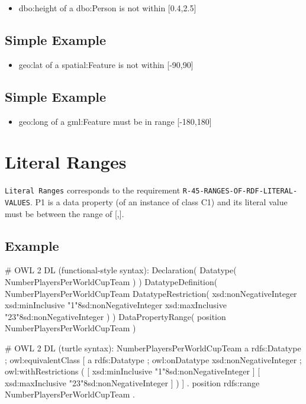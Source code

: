 \documentclass{llncs}
\newcommand{\ms}[1]{\texttt{#1}}
\begin{document}
\begin{itemize}
	\item dbo:height of a dbo:Person is not within [0.4,2.5]
\end{itemize}

\subsection{Simple Example}

\begin{itemize}
	\item geo:lat of a spatial:Feature is not within [-90,90]
\end{itemize}

\subsection{Simple Example}

\begin{itemize}
	\item geo:long of a gml:Feature must be in range [-180,180]
\end{itemize}

\section{Literal Ranges}

\ms{Literal Ranges} corresponds to the requirement
\ms{R-45-RANGES-OF-RDF-LITERAL-} \ms{VALUES}.
P1 is a data property (of an instance of class C1) and its literal value must be between the range of [,].

\subsection{Example}

\begin{ex}
# OWL 2 DL (functional-style syntax):
Declaration( Datatype( NumberPlayersPerWorldCupTeam ) ) 
DatatypeDefinition( 
    NumberPlayersPerWorldCupTeam
    DatatypeRestriction( 
        xsd:nonNegativeInteger 
        xsd:minInclusive "1"^^xsd:nonNegativeInteger 
        xsd:maxInclusive "23"^^xsd:nonNegativeInteger ) )     
DataPropertyRange( position NumberPlayersPerWorldCupTeam ) 
\end{ex}

\begin{ex}
# OWL 2 DL (turtle syntax):
NumberPlayersPerWorldCupTeam
    a rdfs:Datatype ;
    owl:equivalentClass [
        a rdfs:Datatype ;
        owl:onDatatype xsd:nonNegativeInteger ;
        owl:withRestrictions ( 
            [ xsd:minInclusive "1"^^xsd:nonNegativeInteger ]
            [ xsd:maxInclusive "23"^^xsd:nonNegativeInteger ] ) ] .
position rdfs:range NumberPlayersPerWorldCupTeam .
\end{ex}
\end{document}
